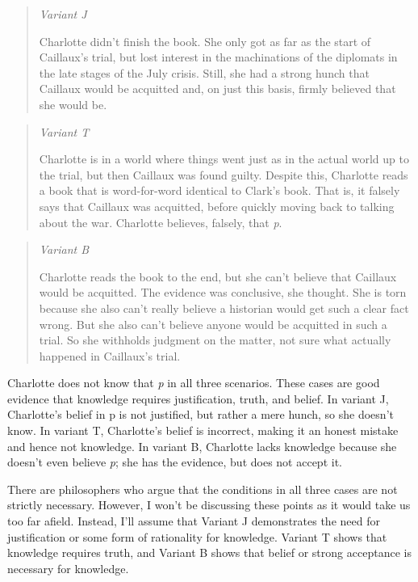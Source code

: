 \documentclass[
  10pt,
  letterpaper,
  twoside]{scrbook}
\begin{document}
\begin{quote}
\emph{Variant J}

Charlotte didn't finish the book. She only got as far as the start of
Caillaux's trial, but lost interest in the machinations of the diplomats
in the late stages of the July crisis. Still, she had a strong hunch
that Caillaux would be acquitted and, on just this basis, firmly
believed that she would be.
\end{quote}

\begin{quote}
\emph{Variant T}

Charlotte is in a world where things went just as in the actual world up
to the trial, but then Caillaux was found guilty. Despite this,
Charlotte reads a book that is word-for-word identical to Clark's book.
That is, it falsely says that Caillaux was acquitted, before quickly
moving back to talking about the war. Charlotte believes, falsely, that
\emph{p}.
\end{quote}

\begin{quote}
\emph{Variant B}

Charlotte reads the book to the end, but she can't believe that Caillaux
would be acquitted. The evidence was conclusive, she thought. She is
torn because she also can't really believe a historian would get such a
clear fact wrong. But she also can't believe anyone would be acquitted
in such a trial. So she withholds judgment on the matter, not sure what
actually happened in Caillaux's trial.
\end{quote}

Charlotte does not know that \emph{p} in all three scenarios. These
cases are good evidence that knowledge requires justification, truth,
and belief. In variant J, Charlotte's belief in p is not justified, but
rather a mere hunch, so she doesn't know. In variant T, Charlotte's
belief is incorrect, making it an honest mistake and hence not
knowledge. In variant B, Charlotte lacks knowledge because she doesn't
even believe \emph{p}; she has the evidence, but does not accept it.

There are philosophers who argue that the conditions in all three cases
are not strictly necessary. However, I won't be discussing these points
as it would take us too far afield. Instead, I'll assume that Variant J
demonstrates the need for justification or some form of rationality for
knowledge. Variant T shows that knowledge requires truth, and Variant B
shows that belief or strong acceptance is necessary for knowledge.
\end{document}
